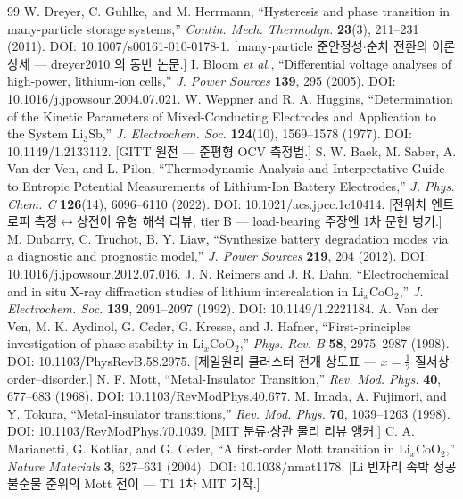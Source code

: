 \begin{thebibliography}{99}
 W. Dreyer, C. Guhlke, and M. Herrmann, ``Hysteresis and phase transition in many-particle storage systems,'' \emph{Contin. Mech. Thermodyn.} \textbf{23}(3), 211--231 (2011). DOI: 10.1007/s00161-010-0178-1. [many-particle 준안정성$\cdot$순차 전환의 이론 상세 --- dreyer2010 의 동반 논문.]
 I. Bloom \emph{et al.}, ``Differential voltage analyses of high-power, lithium-ion cells,'' \emph{J. Power Sources} \textbf{139}, 295 (2005). DOI: 10.1016/j.jpowsour.2004.07.021.
 W. Weppner and R. A. Huggins, ``Determination of the Kinetic Parameters of Mixed-Conducting Electrodes and Application to the System Li$_3$Sb,'' \emph{J. Electrochem. Soc.} \textbf{124}(10), 1569--1578 (1977). DOI: 10.1149/1.2133112. [GITT 원전 --- 준평형 OCV 측정법.]
 S. W. Baek, M. Saber, A. Van der Ven, and L. Pilon, ``Thermodynamic Analysis and Interpretative Guide to Entropic Potential Measurements of Lithium-Ion Battery Electrodes,'' \emph{J. Phys. Chem. C} \textbf{126}(14), 6096--6110 (2022). DOI: 10.1021/acs.jpcc.1c10414. [전위차 엔트로피 측정$\leftrightarrow$상전이 유형 해석 리뷰, tier B --- load-bearing 주장엔 1차 문헌 병기.]
 M. Dubarry, C. Truchot, B. Y. Liaw, ``Synthesize battery degradation modes via a diagnostic and prognostic model,'' \emph{J. Power Sources} \textbf{219}, 204 (2012). DOI: 10.1016/j.jpowsour.2012.07.016.
 J. N. Reimers and J. R. Dahn, ``Electrochemical and in situ X-ray diffraction studies of lithium intercalation in Li$_x$CoO$_2$,'' \emph{J. Electrochem. Soc.} \textbf{139}, 2091--2097 (1992). DOI: 10.1149/1.2221184.
 A. Van der Ven, M. K. Aydinol, G. Ceder, G. Kresse, and J. Hafner, ``First-principles investigation of phase stability in Li$_x$CoO$_2$,'' \emph{Phys. Rev. B} \textbf{58}, 2975--2987 (1998). DOI: 10.1103/PhysRevB.58.2975. [제일원리 클러스터 전개 상도표 --- $x{=}\tfrac12$ 질서상$\cdot$order--disorder.]
 N. F. Mott, ``Metal-Insulator Transition,'' \emph{Rev. Mod. Phys.} \textbf{40}, 677--683 (1968). DOI: 10.1103/RevModPhys.40.677.
 M. Imada, A. Fujimori, and Y. Tokura, ``Metal-insulator transitions,'' \emph{Rev. Mod. Phys.} \textbf{70}, 1039--1263 (1998). DOI: 10.1103/RevModPhys.70.1039. [MIT 분류$\cdot$상관 물리 리뷰 앵커.]
 C. A. Marianetti, G. Kotliar, and G. Ceder, ``A first-order Mott transition in Li$_x$CoO$_2$,'' \emph{Nature Materials} \textbf{3}, 627--631 (2004). DOI: 10.1038/nmat1178. [Li 빈자리 속박 정공 불순물 준위의 Mott 전이 --- T1 1차 MIT 기작.]

\end{thebibliography}
